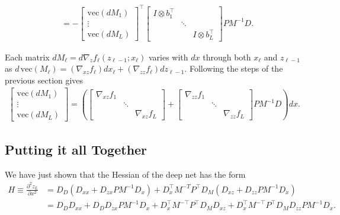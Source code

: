 \documentclass{article}
\begin{document}
\begin{align}
      & = -\begin{bmatrix}
               \mathrm{vec} \left(dM_1\right) \\
               \vdots                         \\
               \mathrm{vec} \left(dM_L\right)
           \end{bmatrix}
    ^\top
    \begin{bmatrix}
        I \otimes b_1^\top \\ &\ddots  \\ && I \otimes b_L^\top
    \end{bmatrix}
    PM^{-1} D.
\end{align}

Each matrix $dM_\ell = d \nabla_z f_\ell(z_{\ell-1}; x_\ell)$ varies with $dx$
through both $x_\ell$ and $z_{\ell -1}$ as $d\,\mathrm{vec} \left(M_\ell\right)
    = \left(\nabla_{xz} f_\ell\right) dx_\ell + \left(\nabla_{zz} f_\ell\right)
    dz_{\ell-1}$. Following the steps of the previous section gives
\begin{align}
    \begin{bmatrix}
        \mathrm{vec}\left(dM_1\right) \\
        \vdots                        \\
        \mathrm{vec}\left(dM_L\right)
    \end{bmatrix}
    =
    \left(
    \begin{bmatrix}
        \nabla_{xz} f_1 &        &                 \\
                        & \ddots &                 \\
                        &        & \nabla_{xz} f_L
    \end{bmatrix}
    +
    \begin{bmatrix}
        \nabla_{zz} f_1 \\ &\ddots& \\ && \nabla_{zz} f_L
    \end{bmatrix}
    P M^{-1} D
    \right)dx.
\end{align}

\subsection{Putting it all Together}

We have just shown that the Hessian of the deep net has the form
\begin{align}
    H \equiv \frac{\partial^2 z_L}{\partial x^2}
     & = D_D \left(D_{xx} + D_{zx} PM^{-1} D_x\right) + D_x^\top M^{-T}P^\top D_M \left(D_{xz}+D_{zz}P M^{-1}D_x\right)           \\
     & = D_DD_{xx}  + D_DD_{zx} PM^{-1} D_x + D_x^\top M^{-\top}P^\top D_M D_{xz}+D_x^\top M^{-\top}P^\top D_M D_{zz}P M^{-1}D_x.
\end{align}
\end{document}
